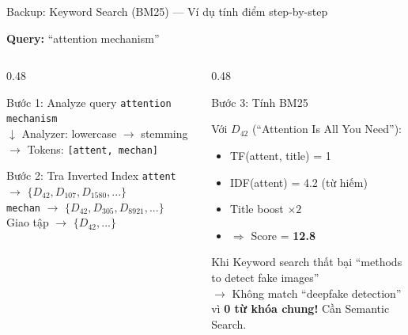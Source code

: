 \begin{frame}{Backup: Keyword Search (BM25) --- Ví dụ tính điểm step-by-step}

\textbf{Query:} ``attention mechanism'' 

\vspace{0.2cm}

\begin{columns}[T]
\begin{column}{0.48\textwidth}

\begin{block}{Bước 1: Analyze query}
{\scriptsize
\texttt{attention mechanism}\\
$\downarrow$ Analyzer: lowercase $\to$ stemming\\
$\to$ Tokens: \texttt{[attent, mechan]}
}
\end{block}

\begin{block}{Bước 2: Tra Inverted Index}
{\scriptsize
\texttt{attent} $\to$ $\{D_{42}, D_{107}, D_{1580}, ...\}$\\
\texttt{mechan} $\to$ $\{D_{42}, D_{305}, D_{8921}, ...\}$\\
Giao tập $\to$ $\{D_{42}, ...\}$
}
\end{block}

\end{column}
\begin{column}{0.48\textwidth}

\begin{exampleblock}{Bước 3: Tính BM25}
{\scriptsize Với $D_{42}$ (``Attention Is All You Need''):
\begin{itemize}
    \item TF(attent, title) = 1
    \item IDF(attent) = 4.2 {\tiny(từ hiếm)}
    \item Title boost $\times 2$
    \item $\Rightarrow$ Score = \textbf{12.8}
\end{itemize}
}
\end{exampleblock}

\vspace{0.1cm}

\begin{alertblock}{Khi Keyword search thất bại}
{\scriptsize ``methods to detect fake images'' \\
$\to$ Không match ``deepfake detection'' \\
vì \textbf{0 từ khóa chung!} Cần Semantic Search.}
\end{alertblock}

\end{column}
\end{columns}
\end{frame}

